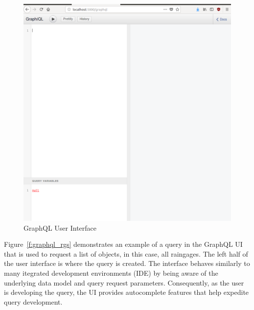 \begin{figure}[htb]
  \centering\includegraphics[width=\columnwidth]
  {./images/graphql_ui.png}
  \caption{GraphQL User Interface}\label{f:graphql_ui}
\end{figure}

Figure~\ref{f:graphql_rgs} demonstrates an example of a query in the GraphQL 
UI that is used to request a list of objects, in this case, all raingages.  
The left half of the user interface is where the query is created.  The 
interface behaves similarly to many itegrated development environments 
(IDE) by being aware of the underlying data model and query request 
parameters.  Consequently, as the user is developing the query, the UI 
provides autocomplete features that help expedite query development.

